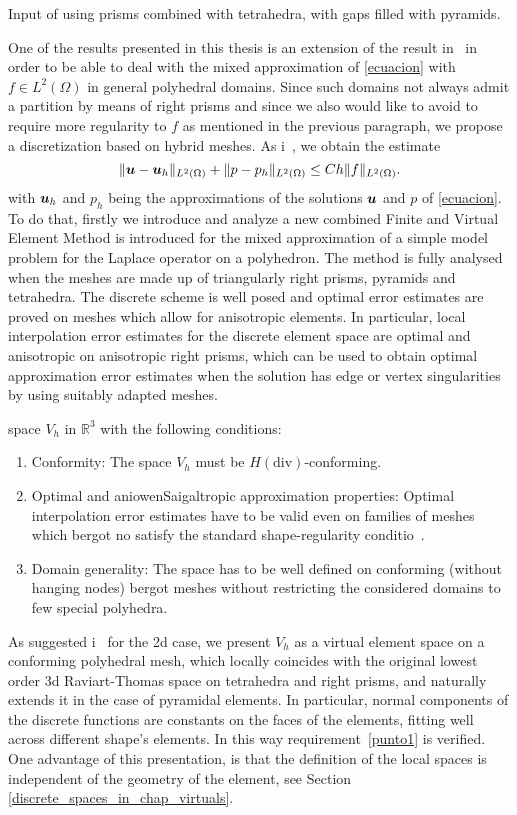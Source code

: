 Input of using prisms combined with tetrahedra, with gaps filled with pyramids.

One of the results presented in this thesis is an extension 
of the result in~\cite{MR1866274} in order to be able to deal with the
mixed approximation of \eqref{ecuacion} with $f\in L^2(\Omega)$ in general polyhedral domains. 
Since such domains not always admit a partition by means of right prisms and since 
we also would like to avoid to require more regularity to $f$ as mentioned in the previous paragraph, we propose a 
discretization based on hybrid meshes. As i~\cite{MR1866274}, we obtain the estimate
\begin{equation}\label{jl2: aim}
 \|\boldsymbol{u}-\boldsymbol{u}_h\|_{L^2(\Omega)} + \|p-p_h\|_{L^2(\Omega)} \le Ch\|f\|_{L^2(\Omega)}.
\end{equation}
with $\boldsymbol{u}_h$ and $p_h$ being the approximations of the solutions $\boldsymbol{u}$ and $p$ of \eqref{ecuacion}. 
To do that, firstly we introduce and analyze a new combined Finite and Virtual 
Element Method is introduced for the 
mixed approximation of a 
simple model problem for the Laplace operator on a polyhedron. The 
method is fully analysed when the meshes are made up of triangularly
right prisms, pyramids and tetrahedra. The discrete scheme 
is well posed and optimal error estimates are proved on meshes which 
allow for anisotropic elements. In particular, local 
interpolation error estimates for the discrete element space are 
optimal and anisotropic on anisotropic right prisms, which can be
used to obtain optimal approximation error estimates when the 
solution has edge or vertex singularities by using suitably adapted meshes.   


space $V_h$ in 
$\mathbb R^3$ with the following conditions:  
\begin{enumerate}
\item \label{punto1} Conformity: The space $V_h$ must be $H(\mbox{div})$-conforming.
\item \label{punto2} Optimal and aniowenSaigaltropic approximation properties: Optimal interpolation error estimates have to be valid even on families of meshes which bergot no satisfy the standard shape-regularity conditio~\cite{ciarlet}.
\item \label{punto3} Domain generality: The space has to be well defined on conforming (without hanging nodes) bergot meshes without restricting the considered domains to few special polyhedra. 
\end{enumerate}
As suggested i~\cite{bfm} for the 2d case, we present $V_h$ as a virtual element space on a conforming 
polyhedral mesh, which 
locally coincides with the original lowest order 3d Raviart-Thomas space on
tetrahedra and right prisms, and naturally extends it in the case of pyramidal elements. 
In particular, normal components of the discrete functions are constants on the faces of the 
elements, fitting well across different shape's elements. In this way requirement~\ref{punto1} is verified. 
One advantage of this presentation, is that the definition of the local spaces is independent of the 
geometry of the element, see Section \ref{discrete_spaces_in_chap_virtuals}. 


